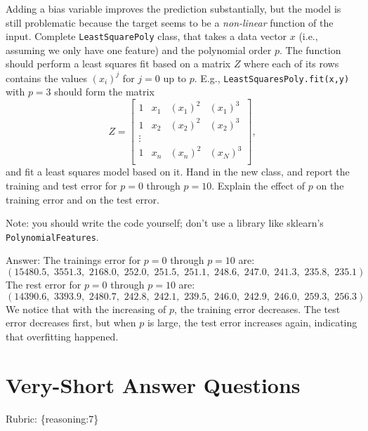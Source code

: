 \documentclass{article}
\def\rubric#1{\gre{Rubric: \{#1\}}}{}
\def\blu#1{{\color{blu}#1}}
\def\gre#1{{\color{gre}#1}}
\begin{document}
Adding a bias variable improves the prediction substantially, but the model is still problematic because the target seems to be a \emph{non-linear} function of the input.
Complete \texttt{LeastSquarePoly} class, that takes a data vector $x$ (i.e., assuming we only have one feature) and the polynomial order $p$. The function should perform a least squares fit based on a matrix $Z$ where each of its rows contains the values $(x_{i})^j$ for $j=0$ up to $p$. E.g., \texttt{LeastSquaresPoly.fit(x,y)}  with $p = 3$ should form the matrix
\[
Z =
\left[\begin{array}{cccc}
1 & x_1 & (x_1)^2 & (x_1)^3\\
1 & x_2 & (x_2)^2 & (x_2)^3\\
\vdots\\
1 & x_n & (x_n)^2 & (x_N)^3\\
\end{array}
\right],
\]
and fit a least squares model based on it.
\blu{Hand in the new class, and report the training and test error for $p = 0$ through $p= 10$. Explain the effect of $p$ on the training error and on the test error.}

Note: you should write the code yourself; don't use a library like sklearn's \texttt{PolynomialFeatures}.

\gre{Answer: The trainings error for $p=0$ through $p=10$ are:\\
$(15480.5,\,\,3551.3,\,\,2168.0,\,\,252.0,\,\,251.5,\,\,251.1,\,\,248.6,\,\,247.0,\,\,241.3,\,\,235.8,\,\,235.1)$\\
The rest error for $p=0$ through $p=10$ are:\\
$(14390.6,\,\,3393.9,\,\,2480.7,\,\,242.8,\,\,242.1,\,\,239.5,\,\,246.0,\,\,242.9,\,\,246.0,\,\,259.3,\,\,256.3)$\\
We notice that with the increasing of $p$, the training error decreases. The test error decreases first, but when $p$ is large, the test error increases again, indicating that overfitting happened.
}

\section{Very-Short Answer Questions}
\rubric{reasoning:7}
\end{document}
